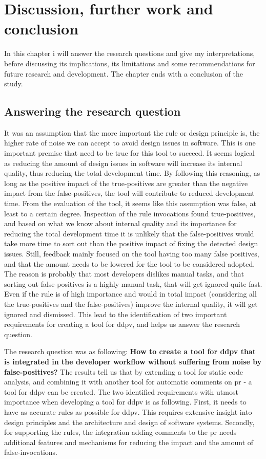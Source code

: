 \documentclass{report}
\begin{document}
\chapter{Discussion, further work and conclusion}
\label{discussion}
In this chapter i will answer the research questions and give my interpretations, before discussing its implications, its limitations and some recommendations for future research and development. The chapter ends with a conclusion of the study.

\section{Answering the research question}

It was an assumption that the more important the rule or design principle is, the higher rate of noise we can accept to avoid design issues in software. This is one important premise that need to be true for this tool to succeed. It seems logical as reducing the amount of design issues in software will increase its internal quality, thus reducing the total development time. By following this reasoning, as long as the positive impact of the true-positives are greater than the negative impact from the false-positives, the tool will contribute to reduced development time. From the evaluation of the tool, it seems like this assumption was false, at least to a certain degree. Inspection of the rule invocations found true-positives, and based on what we know about internal quality and its importance for reducing the total development time it is unlikely that the false-positives would take more time to sort out than the positive impact of fixing the detected design issues. Still, feedback mainly focused on the tool having too many false positives, and that the amount needs to be lowered for the tool to be considered adopted. The reason is probably that most developers dislikes manual tasks, and that sorting out false-positives is a highly manual task, that will get ignored quite fast. Even if the rule is of high importance and would in total impact (considering all the true-positives and the false-positives) improve the internal quality, it will get ignored and dismissed. This lead to the identification of two important requirements for creating a tool for \gls{ddpv}, and helps us answer the research question. 

The research question was as following: \textbf{How to create a tool for \gls{ddpv} that is integrated in the developer workflow without suffering from noise by false-positives?}
The results tell us that by extending a tool for static code analysis, and combining it with another tool for automatic comments on \gls{pr} - a tool for \gls{ddpv} can be created. The two identified requirements with utmost importance when developing a tool for \gls{ddpv} is as following. First, it needs to have as accurate rules as possible for \gls{ddpv}. This requires extensive insight into design principles and the architecture and design of software systems. Secondly, for supporting the rules, the integration adding comments to the \gls{pr} needs additional features and mechanisms for reducing the impact and the amount of false-invocations. 
\end{document}
